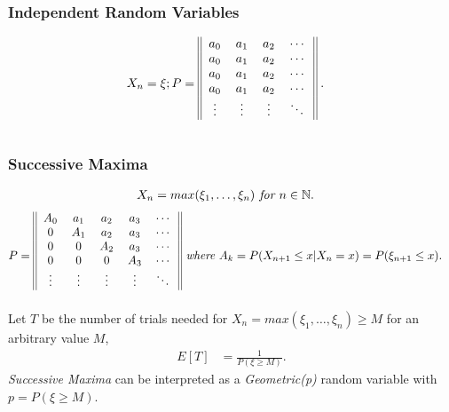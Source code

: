 \documentclass{article}
\begin{document}
\subsubsection{Independent Random Variables}
\begin{align*}
    X_n = \xi; P & = 
    \begin{blockarray}{cccc}
        \begin{block}{||cccc||}
            a_0 & a_1 & a_2 & \cdots \\
            a_0 & a_1 & a_2 & \cdots \\
            a_0 & a_1 & a_2 & \cdots \\
            a_0 & a_1 & a_2 & \cdots \\
            \vdots & \vdots & \vdots &  \ddots \\
        \end{block} 
    \end{blockarray}\; .
\end{align*}

\subsubsection{Successive Maxima}
\begin{align*}
    X_n & = max(\xi_1, \dots, \xi_n) \emph{ for } n\in \mathbb{N}.
\end{align*}
\begin{align*}
    P & = 
        \begin{blockarray}{ccccc}
            \begin{block}{||ccccc||}
                A_0 & a_1 & a_2 & a_3 & \cdots \\
                0 & A_1 & a_2 & a_3 & \cdots \\
                0 & 0 & A_2 & a_3 & \cdots \\
                0 & 0 & 0 & A_3 & \cdots \\
                \vdots & \vdots & \vdots & \vdots & \ddots \\
            \end{block} 
        \end{blockarray} \emph{ where }A_k = P(X_{n+1} \le x | X_n = x) = P(\xi_{n+1} \le x).
\end{align*}
Let $T$ be the number of trials needed for $X_n = max(\xi_1, \dots, \xi_n)\ge M$ for an arbitrary value $M$,
\begin{align*}
    E[T] & = \frac{1}{P(\xi \ge M)}.
\end{align*}
\emph{Successive Maxima} can be interpreted as a \emph{Geometric(p)} random variable with $p = P(\xi \ge M)$.
\end{document}
